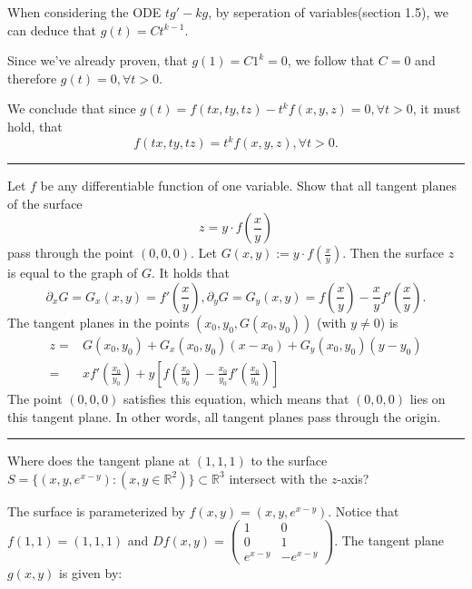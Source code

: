 \documentclass[a4paper,fontsize = 10pt]{article}
\def\R{\mathbb{R}}
\begin{document}
\begin{enumerate}[label=(\alph*)]
  When considering the ODE $tg' - kg$, by seperation of variables(section 1.5), we can deduce that $g(t) = Ct^{k-1}$. 
  
  Since we've already proven, that $g(1) = C1^k = 0$, we follow that $C = 0$ and therefore $g(t) = 0, \forall t > 0$. 

  We conclude that since $g(t) = f(tx, ty, tz) - t^kf(x,y,z)= 0, \forall t > 0$, it must hold, that 
  \[f(tx, ty, tz) = t^kf(x,y,z), \forall t > 0.\]
\end{enumerate}
\vspace{0.1cm}
\hrule
\vspace{0.2cm}

Let $f$ be any differentiable function of one variable. Show that all tangent planes of the surface 
\[z = y \cdot f(\frac{x}{y})\]
pass through the point $(0,0,0)$.
\vspace{0.2cm}
Let $G(x,y) := y \cdot f(\frac{x}{y}).$ Then the surface $z$ is equal to the graph of $G$. It holds that 
\[\partial_x G = G_x(x,y) = f'(\frac{x}{y}),  \partial_y G = G_y(x,y) = f(\frac{x}{y}) - \frac{x}{y}f'(\frac{x}{y}).\]
The tangent planes in the points $(x_0,y_0,G(x_0,y_0))$ (with $y \neq 0$) is 
\begin{align*}
  z =& G(x_0,y_0) + G_x(x_0,y_0)(x-x_0) + G_y(x_0,y_0)(y-y_0)\\
   =& x f'\left(\frac{x_0}{y_0}\right) + y \left[f\left(\frac{x_0}{y_0}\right) - \frac{x_0}{y_0}f'\left(\frac{x_0}{y_0}\right)\right]
\end{align*}
The point $(0,0,0)$ satisfies this equation, which means that $(0,0,0)$ lies on this tangent plane. In other words, all tangent planes pass through the origin.

\vspace{0.1cm}
\hrule
\vspace{0.2cm}

Where does the tangent plane at $(1,1,1)$ to the surface $S = \{(x,y,e^{x-y}): (x,y \in \R^2)\}\subset \R^3$ intersect with the $z$-axis?

The surface is parameterized by $f(x, y) = (x, y, e^{x-y})$. Notice that $f(1, 1) = (1, 1, 1)$ and $Df(x, y) = \begin{pmatrix} 1 & 0 \\ 0 & 1 \\ e^{x-y} & -e^{x-y} \end{pmatrix}$. The tangent plane $g(x, y)$ is given by:
\end{document}
